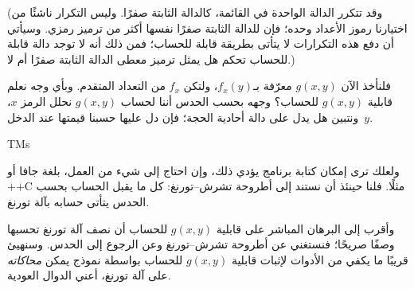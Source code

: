 \documentclass[../../../include/open-logic-section]{subfiles}
\begin{document}
(وقد تتكرر الدالة الواحدة في القائمة، كالدالة الثابتة صفرًا. وليس
التكرار ناشئًا من اختيارنا رموز الأعداد وحده؛ فإن للدالة الثابتة صفرًا
نفسها أكثر من ترميز رمزي. وسيأتي أن دفع هذه
التكرارات لا يتأتى بطريقة قابلة للحساب؛ فمن ذلك أنه لا توجد دالة قابلة للحساب تحكم
هل يمثل ترميز معطى الدالة الثابتة صفرًا أم لا.)

فلنأخذ الآن $g(x,y)$ معرّفة بـ$f_x(y)$، ولتكن $f_x$ من
التعداد المتقدم. وبأي وجه نعلم قابلية $g(x,y)$ للحساب؟ وجهه بحسب
الحدس أننا لحساب $g(x,y)$ نحلل الرمز $x$، ونتبين هل يدل على دالة
أحادية الحجة؛ فإن دل عليها حسبنا قيمتها عند الدخل~$y$.

\begin{tagblock}{TMs}
\begin{digress}
ولعلك ترى إمكان كتابة برنامج يؤدي ذلك، وإن احتاج إلى شيء من العمل،
بلغة جافا أو ++C مثلًا. فلنا حينئذ أن نستند إلى أطروحة
تشرش--تورنغ: كل ما يقبل الحساب بحسب الحدس يتأتى
حسابه بآلة تورنغ.

وأقرب إلى البرهان المباشر على قابلية $g(x,y)$ للحساب أن نصف آلة
تورنغ تحسبها وصفًا صريحًا؛ فنستغني عن أطروحة تشرش--تورنغ
وعن الرجوع إلى الحدس. وسنهيئ قريبًا ما يكفي من الأدوات لإثبات
قابلية $g(x,y)$ للحساب بواسطة نموذج يمكن
\emph{محاكاته} على آلة تورنغ، أعني الدوال العودية.
\end{digress}
\end{tagblock}
\end{document}
